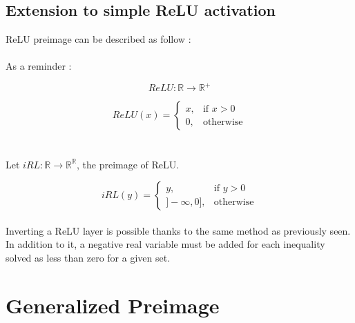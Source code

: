 \documentclass{article}
\begin{document}
\subsection{Extension to simple ReLU activation}

ReLU preimage can be described as follow :
\\
\\
As a reminder :


\begin{equation*}
    ReLU : \mathbb{R} \longrightarrow \mathbb{R^{+}}
\end{equation*}

\[
    ReLU(x)= 
\begin{cases}
    x,& \text{if } x>0\\
    0, & \text{otherwise}
\end{cases}
\]
\\
\\

Let $iRL : \mathbb{R} \longrightarrow \mathbb{R^\mathbb{R}}$, the preimage of ReLU.

\[
    iRL(y)= 
\begin{cases}
    y,& \text{if } y>0\\
            ]-\infty,0],              & \text{otherwise}
\end{cases}
\]
\\
Inverting a ReLU layer is possible thanks to the same method as previously seen.
In addition to it, a negative real variable must be added for each inequality solved as less than zero for a given set.

\newpage
\section{Generalized Preimage}
\end{document}
